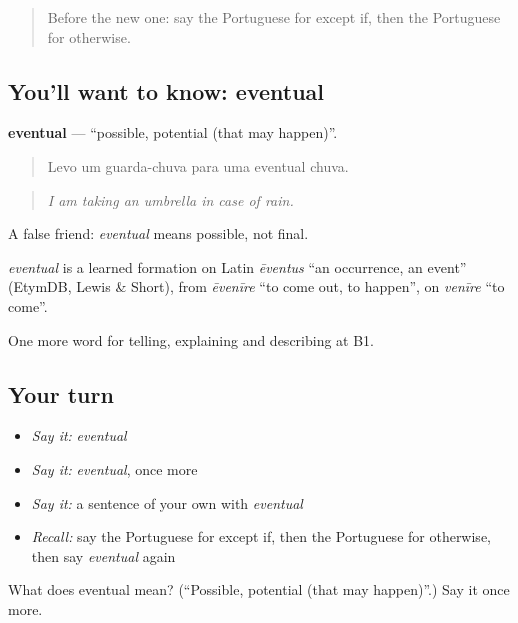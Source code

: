 \begin{quote}
Before the new one: say the Portuguese for except if, then the Portuguese for otherwise.
\end{quote}

\subsection*{You'll want to know: eventual}
\textbf{eventual} — \textquotedblleft{}possible, potential (that may happen)\textquotedblright{}.

\begin{quote}
Levo um guarda-chuva para uma eventual chuva.
\end{quote}

\begin{quote}
\emph{I am taking an umbrella in case of rain.}
\end{quote}

A false friend: \emph{eventual} means possible, not final.

\begin{cousinweb}
\emph{eventual} is a learned formation on Latin \emph{ēventus} \textquotedblleft{}an occurrence, an event\textquotedblright{} (EtymDB, Lewis \& Short), from \emph{ēvenīre} \textquotedblleft{}to come out, to happen\textquotedblright{}, on \emph{venīre} \textquotedblleft{}to come\textquotedblright{}.
\end{cousinweb}

\begin{grammarlens}[title={What you've built}]
One more word for telling, explaining and describing at B1.
\end{grammarlens}

\subsection*{Your turn}
\begin{itemize}
\raggedright
  \item \emph{Say it:} \emph{eventual}
  \item \emph{Say it:} \emph{eventual}, once more
  \item \emph{Say it:} a sentence of your own with \emph{eventual}
  \item \emph{Recall:} say the Portuguese for except if, then the Portuguese for otherwise, then say \emph{eventual} again
\end{itemize}

\begin{tcolorbox}[breakable,colback=teal!4,colframe=teal!35!black,title={Before you move on}]
What does eventual mean? (\textquotedblleft{}Possible, potential (that may happen)\textquotedblright{}.) Say it once more.
\end{tcolorbox}
